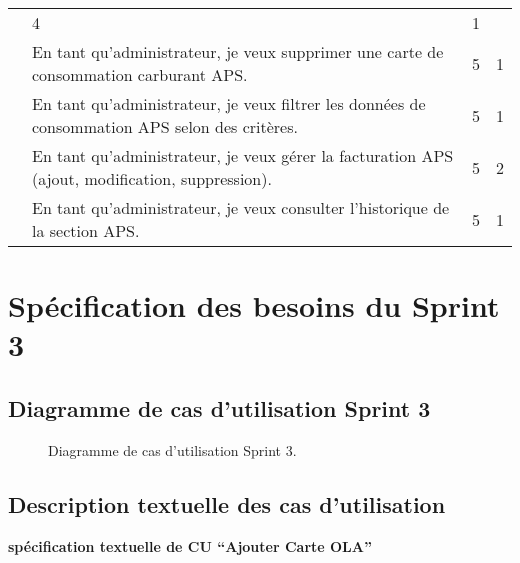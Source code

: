\documentclass[a4paper,11pt]{report}
\begin{document}
\begin{table}[htbp]
\begin{tabular}{|p{3.5cm}|p{8cm}|c|c|}
      & 4 & 1 \\ \cline{2-4}
    & En tant qu'administrateur, je veux supprimer une carte de consommation carburant APS. 
      & 5 & 1 \\ \cline{2-4}
    & En tant qu'administrateur, je veux filtrer les données de consommation APS selon des critères. 
      & 5 & 1 \\ \cline{2-4}
    & En tant qu'administrateur, je veux gérer la facturation APS (ajout, modification, suppression). 
      & 5 & 2 \\ \cline{2-4}
    & En tant qu'administrateur, je veux consulter l’historique de la section APS. 
      & 5 & 1 \\
    \hline
  \end{tabular}
\end{table}

\section{Spécification des besoins du Sprint 3}

\subsection{Diagramme de cas d’utilisation Sprint 3}
\begin{figure}[H]
  \centering
  \setlength{\fboxrule}{1pt}
  \setlength{\fboxsep}{3pt}
  \caption{Diagramme de cas d’utilisation Sprint 3.}
  \label{fig:clone-result}
\end{figure}
\subsection{Description textuelle des cas d'utilisation}

\textbf{spécification textuelle de CU “Ajouter Carte OLA”}
\end{document}
